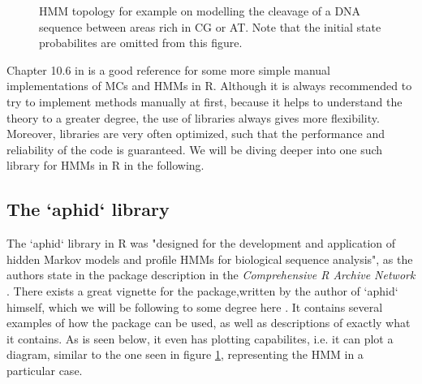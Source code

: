 \documentclass{article}\usepackage[]{graphicx}\usepackage[]{color}
\begin{document}
\begin{figure}[htbp]
\begin{center}
\end{center}
\caption{HMM topology for example on modelling the cleavage of a DNA sequence between areas rich in CG or AT. Note that the initial state probabilites are omitted from this figure. }
\label{fig:toy_hmm}
\end{figure}

Chapter 10.6 in \cite{Krijnen2009} is a good reference for some more simple manual implementations of MCs and HMMs in R. Although it is always recommended to try to implement methods manually at first, because it helps to understand the theory to a greater degree, the use of libraries always gives more flexibility. Moreover, libraries are very often optimized, such that the performance and reliability of the code is guaranteed. We will be diving deeper into one such library for HMMs in R in the following. 

\subsection{The `aphid` library}

The `aphid` library in R was "designed for the development and application of hidden Markov models and profile HMMs for biological sequence analysis", as the authors state in the package description in the \textit{Comprehensive R Archive Network} \cite{CRAN}. There exists a great vignette for the package,written by the author of `aphid` himself, which we will be following to some degree here \cite{Wilkinson2017}. It contains several examples of how the package can be used, as well as descriptions of exactly what it contains. As is seen below, it even has plotting capabilites, i.e. it can plot a diagram, similar to the one seen in figure \ref{fig:toy_hmm}, representing the HMM in a particular case. 
\end{document}
